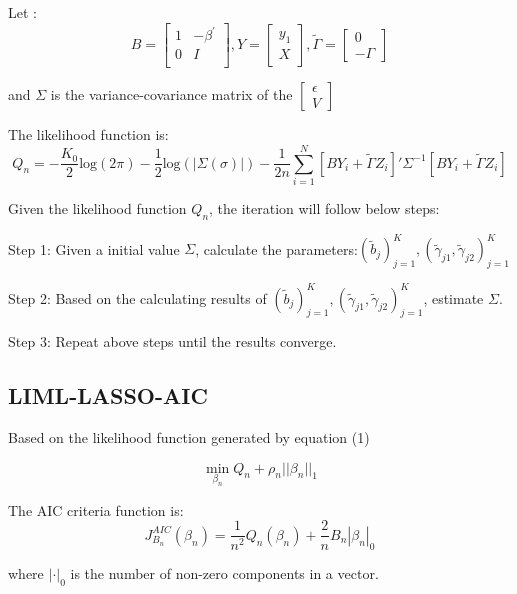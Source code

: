 \documentclass[12pt,pdftex,letterpaper]{article}
\begin{document}
Let :
\begin{equation*}
B=\begin{bmatrix}
 1 & -\beta^{'} \\
 0  &     I  \\
\end{bmatrix}
,
Y=
\begin{bmatrix}
y_{1} \\
X
\end{bmatrix}
,
\tilde{\Gamma}=
\begin{bmatrix}
0 \\
-\Gamma 
\end{bmatrix}
\end{equation*}

and $\Sigma$ is the variance-covariance matrix of the  
$\begin{bmatrix}
\epsilon \\
V
\end{bmatrix}$

The likelihood function is:
$$Q_{n}=-\frac{K_{0}}{2}\mbox{log}(2\pi)-\frac{1}{2}\mbox{log}(|\Sigma(\sigma)|)-\frac{1}{2n}\sum_{i=1}^{N}[BY_{i}+\tilde{\Gamma}Z_{i}]'{\Sigma}^{-1}[BY_{i}+\tilde{\Gamma}Z_{i}]$$


Given the likelihood function $Q_{n}$, the iteration will follow below steps:

Step 1: Given a initial value $\Sigma$, calculate the parameters:$(\tilde{b}_{j})_{j=1}^{K},(\tilde{\gamma}_{j1},\tilde{\gamma}_{j2})_{j=1}^{K}$

Step 2: Based on the calculating results of $(\tilde{b}_{j})_{j=1}^{K},(\tilde{\gamma}_{j1},\tilde{\gamma}_{j2})_{j=1}^{K}$, estimate $\Sigma$.

Step 3: Repeat above steps until the results converge.




\subsection{LIML-LASSO-AIC}
Based on the likelihood function generated by equation (1)


$$\min_{\beta_{n}} Q_{n}+\rho_{n}||\beta_{n}||_{1}$$

The AIC criteria function is:
$$J_{B_{n}}^{AIC}(\beta_{n})=\frac{1}{n^2}Q_{n}(\beta_{n})+\frac{2}{n}B_n|\beta_{n}|_{0}$$

where $|\cdot|_{0}$ is the number of non-zero components in a vector.

\end{document}
